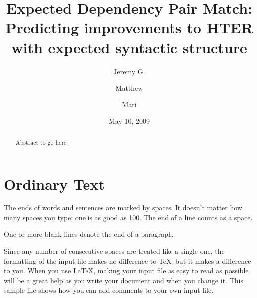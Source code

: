 \documentclass{kluwer}    %
\begin{document}
                                                                                   
\begin{article}
\begin{opening}         
\title{Expected Dependency Pair Match:\\
Predicting improvements to {HTER} with expected syntactic structure} 
\author{Jeremy G. }  
\author{Matthew }
\author{Mari }  
\date{May 10, 2009}

\begin{abstract}
Abstract to go here
\end{abstract}

\end{opening}           

\section{Ordinary Text}  

The ends  of words and sentences are marked 
  by   spaces. It  doesn't matter how many 
spaces    you type; one is as good as 100.  The
end of   a line counts as a space.

One   or more   blank lines denote the  end 
of  a paragraph.  

Since any number of consecutive spaces are treated like a single
one, the formatting of the input file makes no difference to
      \TeX,         %
but it makes a difference to you.  
When you use
      \LaTeX,       %
making your input file as easy to read as possible
will be a great help as you write your document and when you
change it.  This sample file shows how you can add comments to
your own input file.


\end{article}
\end{document}
